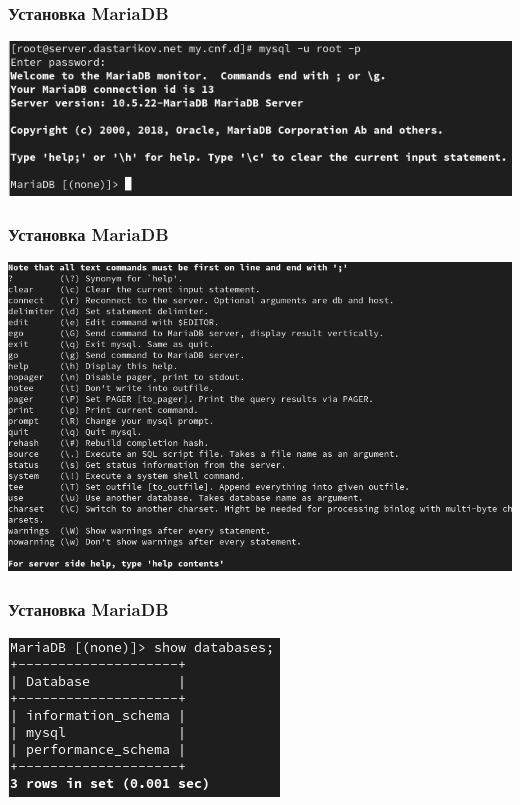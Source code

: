 \begin{frame}
\frametitle{Установка MariaDB}
    \centering
    \includegraphics[width=\textwidth]{../images/image04.png}
\end{frame}

\begin{frame}
\frametitle{Установка MariaDB}
    \centering
    \includegraphics[width=\textwidth]{../images/image05.png}
\end{frame}

\begin{frame}
\frametitle{Установка MariaDB}
    \centering
    \includegraphics[width=\textwidth]{../images/image06.png}
\end{frame}

